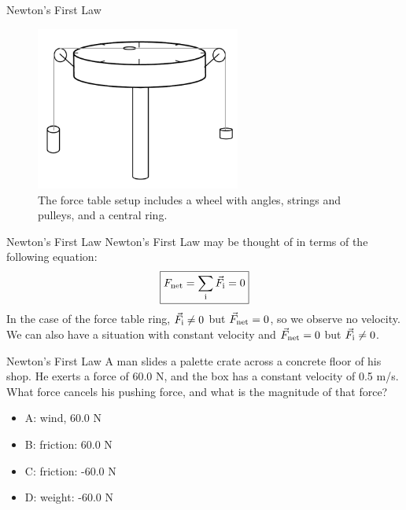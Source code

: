 \documentclass{beamer}
\begin{document}
\begin{frame}{Newton's First Law}
\begin{figure}
\centering
\includegraphics[width=0.6\textwidth]{figures/Table.pdf}
\caption{\label{fig:table} The force table setup includes a wheel with angles, strings and pulleys, and a central ring.}
\end{figure}
\end{frame}

\begin{frame}{Newton's First Law}
Newton's First Law may be thought of in terms of the following equation:
\begin{equation}
\boxed{F_{\rm net} = \sum_{\rm i} \vec{F}_{\rm i} = 0}
\label{eq:firstlaw}
\end{equation}
In the case of the force table ring, $\vec{F}_{\rm i} \neq 0$ but $\vec{F}_{\rm net} = 0$, so we observe no velocity.  We can also have a situation with constant velocity and $\vec{F}_{\rm net} = 0$  but $\vec{F}_{\rm i} \neq 0$.
\end{frame}

\begin{frame}{Newton's First Law}
A man slides a palette crate across a concrete floor of his shop.  He exerts a force of 60.0 N, and the box has a constant velocity of 0.5 m/s.  What force cancels his pushing force, and what is the magnitude of that force?
\begin{itemize}
\item A: wind, 60.0 N
\item B: friction: 60.0 N
\item C: friction: -60.0 N
\item D: weight: -60.0 N
\end{itemize}
\end{frame}
\end{document}
